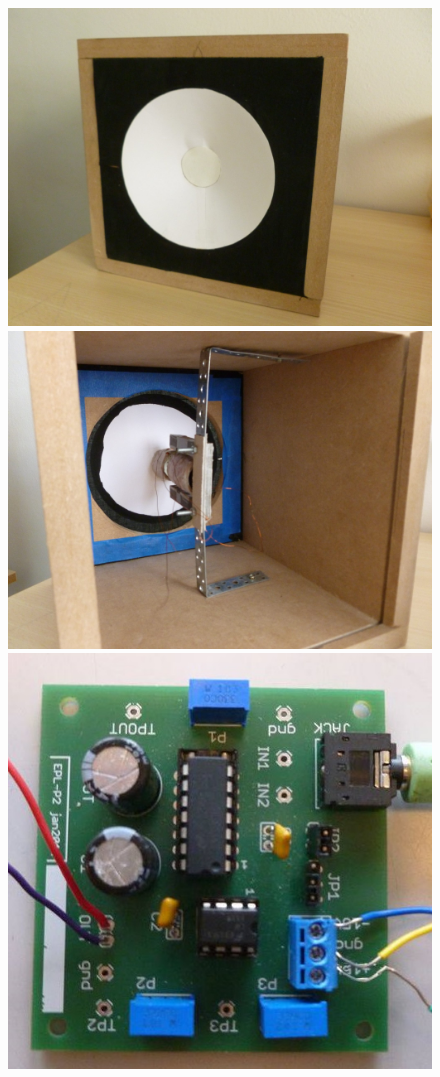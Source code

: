 \begin{abstract-fr}
\begin{figure}[!htb]
	\centering
	\includegraphics[scale=0.07]{ext-baffle.jpg}
	\includegraphics[scale=0.07]{int-baffle.jpg}
	\includegraphics[scale=0.35]{circuit.jpg}

\end{figure}
\end{abstract-fr}
